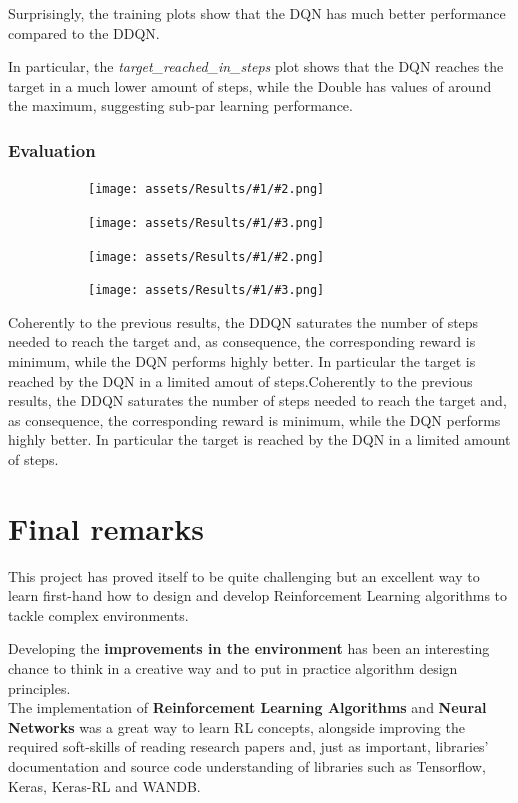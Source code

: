 \documentclass[13pt]{article}
\newcommand{\figrowtwo}[3]{ %
    \begin{figure}[H]
        \centering
        \begin{subfigure}[b]{0.49\textwidth}
            \centering
            \texttt{[image: assets/Results/\#1/\#2.png]}
        \end{subfigure}
        \hfill
        \begin{subfigure}[b]{0.49\textwidth}
            \centering
            \texttt{[image: assets/Results/\#1/\#3.png]}
        \end{subfigure}
    \end{figure}
}
\begin{document}
Surprisingly, the training plots show that the DQN has much better performance compared to the DDQN.

In particular, the \emph{target\_reached\_in\_steps} plot shows that the DQN reaches the target in a much lower amount of steps, while the Double has values of around the maximum, suggesting sub-par learning performance.

\subsubsection*{Evaluation}
\figrowtwo{RLAlgorithms/Test}{reward_mean}{target_reached_in_steps}
\figrowtwo{RLAlgorithms/Test}{action_mean}{perc_agents_completed}

Coherently to the previous results, the DDQN saturates the number of steps needed to reach the target and, as consequence, the corresponding reward is minimum, while the DQN performs highly better. In particular the target is reached by the DQN in a limited amout of steps.Coherently to the previous results, the DDQN saturates the number of steps needed to reach the target and, as consequence, the corresponding reward is minimum, while the DQN performs highly better. In particular the target is reached by the DQN in a limited amount of steps.

\newpage

%
%

\section{Final remarks}

\vspace{0.5cm}

This project has proved itself to be quite challenging but an excellent way to learn first-hand how to design and develop Reinforcement Learning algorithms to tackle complex environments. \\
\newline

Developing the \textbf{improvements in the environment} has been an interesting chance to think in a creative way and to put in practice algorithm design principles.\\ 
The implementation of \textbf{Reinforcement Learning Algorithms} and \textbf{Neural Networks} was a great way to learn RL concepts, alongside improving the required soft-skills of reading research papers and, just as important, libraries' documentation and source code understanding of libraries such as Tensorflow, Keras, Keras-RL and WANDB. \\
\newline
\end{document}
